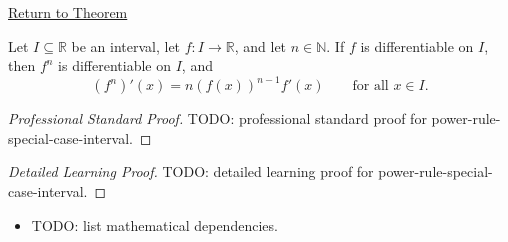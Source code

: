 \newpage
{}
\label{prf:power-rule-special-case-interval}

\begin{remark*}[Return]
\hyperref[cor:power-rule-special-case-interval]{Return to Theorem}
\end{remark*}

\begin{corollary*}
Let $I \subseteq \mathbb{R}$ be an interval, let $f : I \to \mathbb{R}$, and let $n \in \mathbb{N}$. If $f$ is differentiable on $I$, then $f^n$ is differentiable on $I$, and
\[
(f^n)'(x) = n(f(x))^{n-1}f'(x) \qquad \text{for all } x \in I.
\]
\end{corollary*}

\begin{proof}[Professional Standard Proof]
\LRAProofBodyStart
TODO: professional standard proof for power-rule-special-case-interval.
\end{proof}

\begin{proof}[Detailed Learning Proof]
\LRAProofBodyStart
TODO: detailed learning proof for power-rule-special-case-interval.
\end{proof}

\begin{remark*}
\end{remark*}

\begin{dependencies}
\begin{itemize}
  \item TODO: list mathematical dependencies.
\end{itemize}
\end{dependencies}

\clearpage
